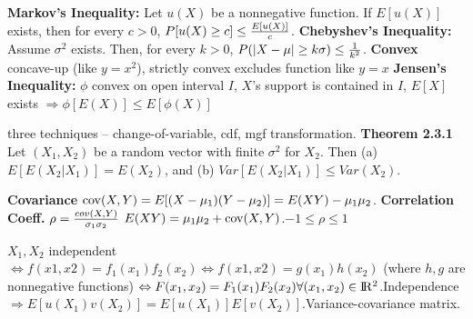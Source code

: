 {{\bf Markov's Inequality:} Let $u(X)$ be a nonnegative function.  If $E[u(X)]$ exists, then for every $c > 0$, $P[u(X) \geq c] \leq {E[u(X)]\over c}$.\quad
{\bf Chebyshev's Inequality:} Assume $\sigma^2$ exists.  Then, for every $k>0$, $P(|X-\mu| \geq k\sigma) \leq {1 \over k^2}$.\quad 
{\bf Convex } concave-up (like $y=x^2$), strictly convex excludes function like $y=x$\quad%
{\bf Jensen's Inequality:} $\phi$ convex on open interval $I$, $X$'s support is contained in $I$, $E[X]$ exists $\Rightarrow \phi[E(X)]\leq E[\phi(X)]$\quad 

three techniques -- change-of-variable, cdf, mgf transformation.
{\bf Theorem 2.3.1} Let $(X_1,X_2)$ be a random vector with finite $\sigma^2$ for $X_2$. Then (a) $E[E(X_2|X_1)]=E(X_2)$, and (b) $Var[E(X_2|X_1)] \leq Var(X_2)$.\quad

{\bf Covariance} ${\rm cov}(X,Y) = E[(X-\mu_1)(Y-\mu_2)] = E(XY) - \mu_1\mu_2$.\quad
{\bf Correlation Coeff.} $\rho = {cov(X,Y)\over \sigma_1\sigma_2}$\quad
$E(XY) = \mu_1\mu_2 + {\rm cov}(X,Y)$.\quad $-1 \leq \rho \leq 1$

$X_1,X_2$ independent $\Leftrightarrow f(x1,x2) = f_1(x_1)f_2(x_2) \Leftrightarrow f(x1,x2) = g(x_1)h(x_2)$ (where $h,g$ are nonnegative functions) $\Leftrightarrow F(x_1,x_2)=F_1(x_1)F_2(x_2) \forall (x_1,x_2) \in \rm I\!R^2$.\quad Independence $\Rightarrow E[u(X_1)v(X_2)] = E[u(X_1)]E[v(X_2)]$.\quad Variance-covariance matrix.

}
